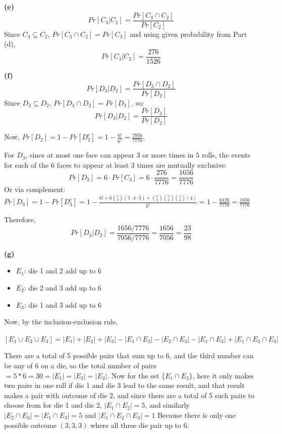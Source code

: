 \documentclass{article}
\begin{document}
\vspace{\baselineskip}
\noindent\textbf{(e)}
\[Pr[C_3 | C_2] = \frac{Pr[C_3 \cap C_2]}{Pr[C_2]}\]
Since $C_3 \subseteq C_2$, $Pr[C_3 \cap C_2] = Pr[C_3]$ and using given probability from Part (d),
\[Pr[C_3 | C_2] = \frac{276}{1526}\]

\vspace{\baselineskip}
\noindent\textbf{(f)}
\[Pr[D_3 | D_2] = \frac{Pr[D_3 \cap D_2]}{Pr[D_2]}\]
Since $D_3 \subseteq D_2$, $Pr[D_3 \cap D_2] = Pr[D_3]$, so:
\[Pr[D_3 | D_2] = \frac{Pr[D_3]}{Pr[D_2]}\]

Now, $Pr[D_2] = 1 - Pr[D_2^c] = 1 - \frac{6!}{6^5} = \frac{7056}{7776}$.

For $D_3$, since at most one face can appear $3$ or more times in $5$ rolls, the events for each of the $6$ faces to appear at least 3 times are mutually exclusive:
\[Pr[D_3] = 6 \cdot Pr[C_3] = 6 \cdot \frac{276}{7776} = \frac{1656}{7776}\]
Or via complement:
$Pr[D_3] = 1 - Pr[D_3^c] = 1 - \frac{6! + 6\binom{5}{2}(5 \cdot 4 \cdot 3) + \binom{6}{2}\binom{5}{2}\binom{3}{2}(4)}{6^5} = 1 - \frac{6120}{7776} = \frac{1656}{7776}$

Therefore,
\[Pr[D_3 | D_2] = \frac{1656 / 7776}{7056 / 7776} = \frac{1656}{7056} = \frac{23}{98}\]


\vspace{\baselineskip}
\noindent\textbf{(g)}
\begin{itemize}
\item $E_1$: die 1 and 2 add up to 6
\item $E_2$: die 2 and 3 add up to 6
\item $E_3$: die 1 and 3 add up to 6
\end{itemize}
Now, by the inclusion-exclusion rule,

$[E_1 \cup E_2 \cup E_3] = |E_1| + |E_2| + |E_3| - |E_1 \cap E_2| - |E_2 \cap E_3| - |E_1 \cap E_3| + |E_1 \cap E_2 \cap E_3|$

There are a total of 5 possible pairs that sum up to 6, and the third number can be any of 6 on a die, so the total number of pairs $= 5 * 6 = 30 = |E_1| = |E_2| = |E_3|$.
Now for the set $\{E_1 \cap E_2\}$, here it only makes two pairs in one roll if die 1 and die 3 lead to the same result, and that result makes a pair with
outcome of die 2, and since there are a total of 5 such pairs to choose from for die 1 and die 2, $|E_1 \cap E_2| = 5$, and similarly $|E_2 \cap E_3| = |E_1 \cap E_3| = 5$
and $|E_1 \cap E_2 \cap E_3| = 1$ Because there is only one possible outcome $(3,3,3)$ where all three die pair up to 6.
\end{document}
